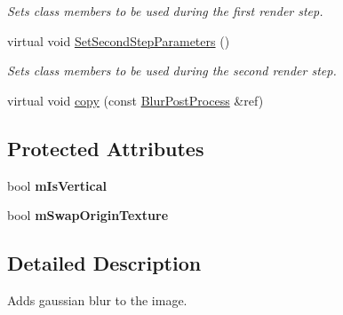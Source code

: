 \begin{DoxyCompactItemize}
\begin{DoxyCompactList}\small\item\em Sets class members to be used during the first render step. \end{DoxyCompactList}\item 
\mbox{\label{class_geometry_engine_1_1_geometry_post_process_1_1_double_pass_post_process_1_1_blur_post_process_ab63920f52916bd66cae59f9407957572}} 
virtual void \mbox{\hyperlink{class_geometry_engine_1_1_geometry_post_process_1_1_double_pass_post_process_1_1_blur_post_process_ab63920f52916bd66cae59f9407957572}{Set\+Second\+Step\+Parameters}} ()
\begin{DoxyCompactList}\small\item\em Sets class members to be used during the second render step. \end{DoxyCompactList}\item 
virtual void \mbox{\hyperlink{class_geometry_engine_1_1_geometry_post_process_1_1_double_pass_post_process_1_1_blur_post_process_ab3239347164b5c0bbe1b603f4d085181}{copy}} (const \mbox{\hyperlink{class_geometry_engine_1_1_geometry_post_process_1_1_double_pass_post_process_1_1_blur_post_process}{Blur\+Post\+Process}} \&ref)
\end{DoxyCompactItemize}
\subsection*{Protected Attributes}
\begin{DoxyCompactItemize}
\item 
\mbox{\label{class_geometry_engine_1_1_geometry_post_process_1_1_double_pass_post_process_1_1_blur_post_process_a2336c35628369ac4f36c0ae095a8b784}} 
bool {\bfseries m\+Is\+Vertical}
\item 
\mbox{\label{class_geometry_engine_1_1_geometry_post_process_1_1_double_pass_post_process_1_1_blur_post_process_a405f724adbe07bc44cd10785b061bdfb}} 
bool {\bfseries m\+Swap\+Origin\+Texture}
\end{DoxyCompactItemize}


\subsection{Detailed Description}
Adds gaussian blur to the image. 

